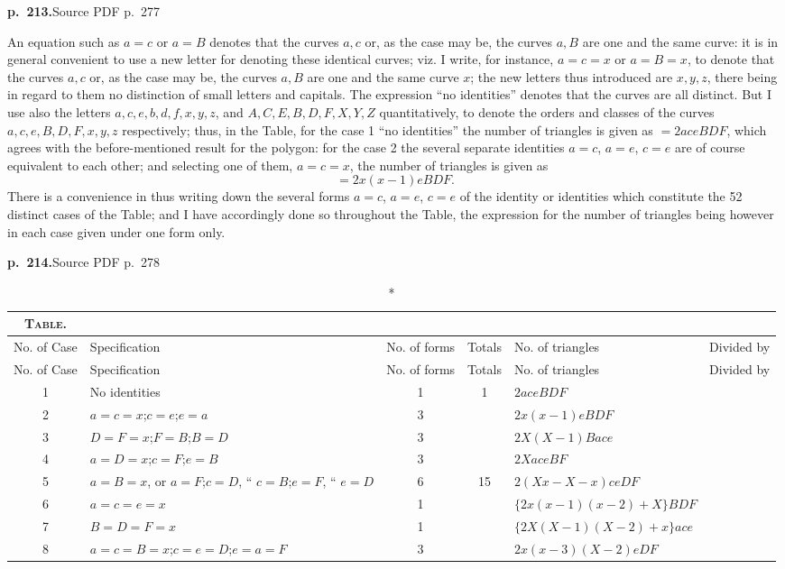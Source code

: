 \documentclass[11pt,a4paper]{article}
\newcommand{\sourcepage}[2]{\par\bigskip\noindent\textbf{p.~#1.}\hfill{\footnotesize Source PDF p.~#2}\par\nobreak\medskip}
\begin{document}
\sourcepage{213}{277}
An equation such as $a=c$ or $a=B$ denotes that the curves $a,c$ or, as the case may be, the curves $a,B$ are one and the same curve: it is in general convenient to use a new letter for denoting these identical curves; viz. I write, for instance, $a=c=x$ or $a=B=x$, to denote that the curves $a,c$ or, as the case may be, the curves $a,B$ are one and the same curve $x$; the new letters thus introduced are $x,y,z$, there being in regard to them no distinction of small letters and capitals. The expression ``no identities'' denotes that the curves are all distinct. But I use also the letters $a,c,e,b,d,f,x,y,z$, and $A,C,E,B,D,F,X,Y,Z$ quantitatively, to denote the orders and classes of the curves $a,c,e,B,D,F,x,y,z$ respectively; thus, in the Table, for the case 1 ``no identities'' the number of triangles is given as $=2aceBDF$, which agrees with the before-mentioned result for the polygon: for the case 2 the several separate identities $a=c$, $a=e$, $c=e$ are of course equivalent to each other; and selecting one of them, $a=c=x$, the number of triangles is given as
\[
=2x(x-1)eBDF.
\]
There is a convenience in thus writing down the several forms $a=c$, $a=e$, $c=e$ of the identity or identities which constitute the 52 distinct cases of the Table; and I have accordingly done so throughout the Table, the expression for the number of triangles being however in each case given under one form only.

\clearpage
\sourcepage{214}{278}
\begin{landscape}
\begin{center}
\small
\begin{longtable}{c p{7.6cm} c c p{8.2cm} c}
\caption*{\textsc{Table.}}\\
\toprule
No. of Case&Specification&No. of forms&Totals&No. of triangles&Divided by\\
\midrule
\endfirsthead
\toprule
No. of Case&Specification&No. of forms&Totals&No. of triangles&Divided by\\
\midrule
\endhead
1&No identities&1&1&$2aceBDF$&\\
2&$a=c=x$;\quad $c=e$;\quad $e=a$&3&&$2x(x-1)eBDF$&\\
3&$D=F=x$;\quad $F=B$;\quad $B=D$&3&&$2X(X-1)Bace$&\\
4&$a=D=x$;\quad $c=F$;\quad $e=B$&3&&$2XaceBF$&\\
5&$a=B=x$, or $a=F$;\quad $c=D$, `` $c=B$;\quad $e=F$, `` $e=D$&6&15&$2(Xx-X-x)ceDF$&\\
6&$a=c=e=x$&1&&$\{2x(x-1)(x-2)+X\}BDF$&\\
7&$B=D=F=x$&1&&$\{2X(X-1)(X-2)+x\}ace$&\\
8&$a=c=B=x$;\quad $c=e=D$;\quad $e=a=F$&3&&$2x(x-3)(X-2)eDF$&\\
\bottomrule
\end{longtable}
\end{center}
\end{landscape}
\end{document}
